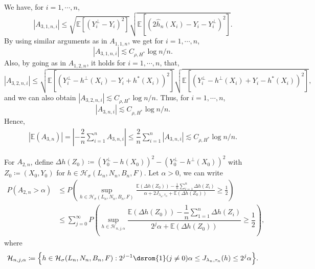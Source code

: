 \documentclass[10pt,twoside]{article}
\numberwithin{equation}{section}
\newcommand{\E}{\ensuremath{\mathbb{E}}}
\def \ind{\textrm{\dsrom{1}}}
\begin{document}
%
We have, for $ i=1, \cdots, n$,  
%
\[ | A_ {3, 1, n, i} | \leq  \sqrt{\E \left[ (Y_i^ {\bot}  - Y_i) ^2 \right]} \sqrt{\E \left[(2 \widehat{h}_n (X_i) - Y_i  - Y_i^ {\bot}) ^2 \right]}. \]
%
By using similar arguments as in $A_ {1, 1, n} $, we get for $i=1, \cdots, n$,   
%
\[ | A_ {3, 1, n, i}| \lesssim C_{\rho, H^ {*}} \log n/n.  \] 
%
Also, by going as in $A_ {1, 2, n} $, it holds for $i=1, \cdots, n$, that,  
% 
%
\[ |A_ {3, 2, n, i}| \leq \sqrt{\E \left[ (Y_i^ {\bot} - h^ {\bot} (X_i) - Y_i + h^ {*} (X_i)) ^2 \right]} \sqrt{\E \left[(Y_i^ {\bot} - h^ {\bot} (X_i) + Y_i  - h^ {*} (X_i) )^2 \right]},  \]
%
and we can also obtain $|A_ {3, 2, n, i} | \lesssim C_{\rho, H^ {*}} \log n/n$. 
%
Thus, for $i =1, \cdots, n$,  
%
\[ |A_ {3, n, i} |  \lesssim C_{\rho, H^ {*}} \log n/n.  \] 
%
Hence, 
%
\begin{align}
|\E (A_ {3, n})|  \nonumber  = |-\dfrac{2}{n} \sum_{i=1}^n A_ {3, n, i} |
 \leq \dfrac{2}{n} \sum_{i=1}^n |A_ {3, n, i} | 
  \lesssim C_{\rho, H^ {*}} \log n/n.
\end{align}
%

For $A_ {2, n} $,  define  $\Delta h (Z_0) \coloneqq  (Y_0^ {\bot}  - h (X_0) ) ^2 - (Y_0^ {\bot}  - h^ {\bot} (X_0) ) ^2 $  with  $ Z_0 \coloneqq (X_0, Y_0) $ for  $h \in \mathcal{H}_ {\sigma}(L_n, N_n, B_n, F) $.
%
Let $\alpha > 0$,  we can write  
%
\begin{align*}
P(A_ {2, n} > \alpha) & \leq P\left(\underset{h \in \mathcal{H}_ {\sigma}(L_n, N_n, B_n, F)}{\sup} \frac{ \E(\Delta h (Z_0)) - \frac{1}{n}\sum_{i=1}^n \Delta h (Z_i)}{\alpha + 2J_{\lambda_n, \tau_n} + \E(\Delta h (Z_0))} \ge \frac{1}{2}\right) 
\\
 & \leq \sum_{j=0}^ {\infty} P\left(\underset{h \in \mathcal{H}_ {n, j, \alpha}}{\sup} \dfrac{ \E (\Delta h (Z_0)) - \dfrac{1}{n} \sum_{1=1}^n \Delta h (Z_i) }{ 2^j \alpha + \E (\Delta h (Z_0) )} \ge \dfrac{1}{2} \right),
\end{align*} 
%
where 
%
\begin{equation}
\mathcal{H}_ {n, j, \alpha} \coloneqq  \Big\{h \in \mathcal{H}_ {\sigma}(L_n, N_n, B_n, F): 2^{j - 1} \ind{(j \ne 0)} \alpha \leq  J_{\lambda_n, \tau_n}(h) \leq 2^j \alpha  \Big\}. 
\end{equation}
%
\end{document}
